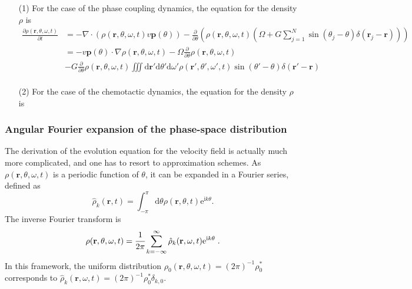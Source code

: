 \documentclass{article}
\begin{document}
\begin{enumerate}
    \item[(1)] For the case of the phase coupling dynamics, the equation for the density $\rho$ is
    \begin{equation}
        \begin{aligned}
            \frac{\partial \rho \left( \mathbf{r},\theta ,\omega ,t \right)}{\partial t}&=-\nabla \cdot \left( \rho \left( \mathbf{r},\theta ,\omega ,t \right) v\mathbf{p}\left( \theta \right) \right) -\frac{\partial}{\partial \theta}\left( \rho \left( \mathbf{r},\theta ,\omega ,t \right) \left( \Omega +G\sum_{j=1}^N{\sin \left( \theta _j-\theta \right) \delta \left( \mathbf{r}_j-\mathbf{r} \right)} \right) \right)\\
            &=-v\mathbf{p}\left( \theta \right) \cdot \nabla \rho \left( \mathbf{r},\theta ,\omega ,t \right) -\Omega \frac{\partial}{\partial \theta}\rho \left( \mathbf{r},\theta ,\omega ,t \right) \\
            &-G\frac{\partial}{\partial \theta}\rho \left( \mathbf{r},\theta ,\omega ,t \right) \iiint{\text{d}\mathbf{r}'\text{d}\theta '\text{d}\omega '\rho \left( \mathbf{r}',\theta ',\omega ',t \right) \sin \left( \theta '-\theta \right) \delta \left( \mathbf{r}'-\mathbf{r} \right)}\\
        \end{aligned}
    \end{equation}
    \item[(2)] For the case of the chemotactic dynamics, the equation for the density $\rho$ is
\end{enumerate}

\subsubsection{Angular Fourier expansion of the phase-space distribution}
The derivation of the evolution equation for the velocity field is actually much more complicated, and one has to resort to approximation schemes. As $\rho(\mathbf{r},\theta,\omega,t)$ is a periodic function of $\theta$, it can be expanded in a Fourier series, defined as
\begin{equation}
    \hat{\rho}_k(\mathbf{r},t)=\int_{-\pi}^\pi\mathrm{d}\theta \rho(\mathbf{r},\theta,t) \mathrm{e}^{\mathrm{i}k\theta}.
\end{equation}
The inverse Fourier transform is
\begin{equation}
    \rho(\mathbf{r},\theta,\omega,t)=\cfrac{1}{2\pi}\sum_{k=-\infty}^{\infty}{\hat{\rho}_k(\mathbf{r},\omega,t)\mathrm{e}^{\textrm{i}k\theta}}\;.
\end{equation}
In this framework, the uniform distribution $\rho _0(\mathbf{r},\theta ,\omega ,t)=\left( 2\pi \right) ^{-1}\rho_{0}^{*}$ corresponds to $\hat{\rho}_k(\mathbf{r},\omega,t)=\left( 2\pi \right) ^{-1}\rho_{0}^{*}\delta_{k,0}$.
\end{document}
